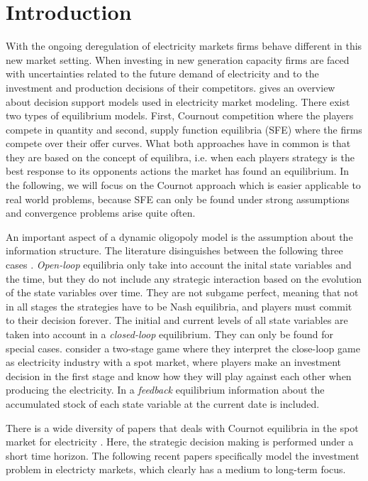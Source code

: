 \section{Introduction}

With the ongoing deregulation of electricity markets firms behave different in this new market setting. When investing in new generation capacity firms are faced with uncertainties related to the future demand of electricity and to the investment and production decisions of their competitors. \cite{Ventosa2005} gives an overview about decision support models used in electricity market modeling. There exist two types of equilibrium models. First, Cournout competition where the players compete in quantity and second, supply function equilibria (SFE) where the firms compete over their offer curves. What both approaches have in common is that they are based on the concept of \cite{Nash1951} equilibra, i.e. when each players strategy is the best response to its opponents actions the market has found an equilibrium. In the following, we will focus on the Cournot approach which is easier applicable to real world problems, because SFE can only be found under strong assumptions and convergence problems arise quite often.

An important aspect of a dynamic oligopoly model is the assumption about the information structure. The literature disinguishes between the following three cases \citep[see, e.g.,][]{Cellini2004}. \emph{Open-loop} equilibria only take into account the inital state variables and the time, but they do not include any strategic interaction based on the evolution of the state variables over time. They are not subgame perfect, meaning that not in all stages the strategies have to be Nash equilibria, and players must commit to their decision forever. The initial and current levels of all state variables are taken into account in a \emph{closed-loop} equilibrium. They can only be found for special cases. \cite{Murphy2005} consider a two-stage game where they interpret the close-loop game as electricity industry with a spot market, where players make an investment decision in the first stage and know how they will play against each other when producing the electricity. In a \emph{feedback} equilibrium information about the accumulated stock of each state variable at the current date is included.

There is a wide diversity of papers that deals with Cournot equilibria in the spot market for electricity \citep[see, e.g.][]{Borenstein1999, Otero-Novas2000}. Here, the strategic decision making is performed under a short time horizon. The following recent papers specifically model the investment problem in electricty markets, which clearly has a medium to long-term focus.

